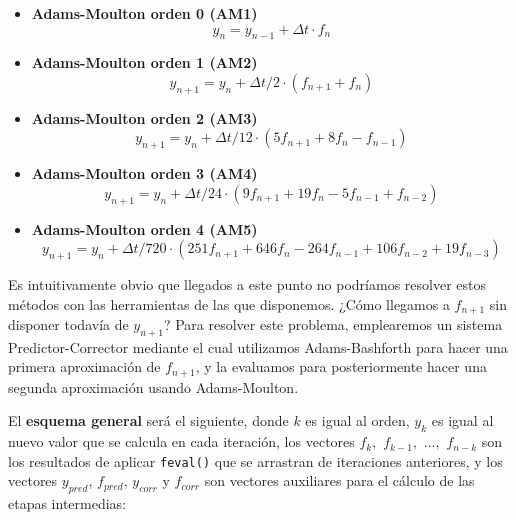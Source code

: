 \begin{itemize}
	\item \textbf{Adams-Moulton orden 0 (AM1)}
	\begin{equation}
		\label{eq:AdamsMoulton1}
		y_n = y_{n-1} + \Delta t \cdot f_n
	\end{equation}
	
	\item \textbf{Adams-Moulton orden 1 (AM2)}
	\begin{equation}
		\label{eq:AdamsMoulton2}
		y_{n+1} = y_n + \Delta t/2 \cdot (f_{n+1} + f_n)
	\end{equation}
	
	\item \textbf{Adams-Moulton orden 2 (AM3)}
	\begin{equation}
		\label{eq:AdamsMoulton3}
		y_{n+1} = y_n + \Delta t/12 \cdot (5f_{n+1} + 8f_n - f_{n-1})
	\end{equation}
	
	\item \textbf{Adams-Moulton orden 3 (AM4)}
	\begin{equation}
		\label{eq:AdamsMoulton4}
		y_{n+1} = y_n + \Delta t/24 \cdot (9f_{n+1} + 19f_n - 5f_{n-1} + f_{n-2})
	\end{equation}
	
	\item \textbf{Adams-Moulton orden 4 (AM5)}
	\begin{equation}
		\label{eq:AdamsMoulton5}
		y_{n+1} = y_n + \Delta t/720 \cdot (251f_{n+1} + 646f_n - 264f_{n-1} + 106f_{n-2} + 19f_{n-3})
	\end{equation}
\end{itemize}

Es intuitivamente obvio que llegados a este punto no podríamos resolver estos métodos con las herramientas de las que disponemos. ¿Cómo llegamos a $f_{n+1}$ sin disponer todavía de $y_{n+1}$? Para resolver este problema, emplearemos un sistema Predictor-Corrector mediante el cual utilizamos Adams-Bashforth para hacer una primera aproximación de $f_{n+1}$, y la evaluamos para posteriormente hacer una segunda aproximación usando Adams-Moulton. 

El \textbf{esquema general} será el siguiente, donde $k$ es igual al orden, $y_k$ es igual al nuevo valor que se calcula en cada iteración, los vectores $f_k,$ $f_{k-1},$ $...,$ $f_{n-k}$ son los resultados de aplicar \texttt{feval()} que se arrastran de iteraciones anteriores, y los vectores $y_{pred}$, $f_{pred}$, $y_{corr}$ y $f_{corr}$ son vectores auxiliares para el cálculo de las etapas intermedias:

